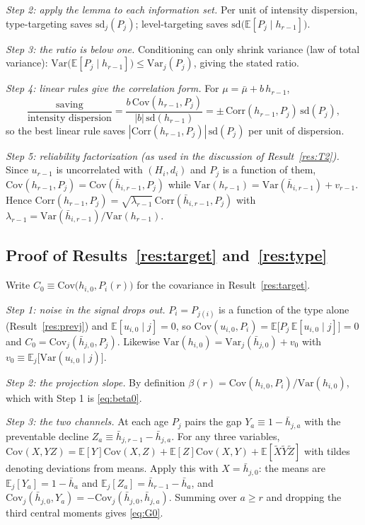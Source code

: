 \documentclass[11pt]{article}
\theoremstyle{remark}
\newcommand{\E}{\mathbb{E}}
\newcommand{\Var}{\mathrm{Var}}
\newcommand{\Cov}{\mathrm{Cov}}
\newcommand{\Corr}{\mathrm{Corr}}
\begin{document}
\emph{Step 2: apply the lemma to each information set.} Per unit of intensity dispersion, type-targeting saves $\mathrm{sd}_j(P_j)$; level-targeting saves $\mathrm{sd}\bigl(\E[P_j\mid h_{r-1}]\bigr)$.

\emph{Step 3: the ratio is below one.} Conditioning can only shrink variance (law of total variance): $\Var\bigl(\E[P_j\mid h_{r-1}]\bigr)\le\Var_j(P_j)$, giving the stated ratio.

\emph{Step 4: linear rules give the correlation form.} For $\mu=\bar\mu+b\,h_{r-1}$,
\begin{equation}
\frac{\text{saving}}{\text{intensity dispersion}}
=\frac{b\,\Cov(h_{r-1},P_j)}{|b|\,\mathrm{sd}(h_{r-1})}
=\pm\,\Corr(h_{r-1},P_j)\,\mathrm{sd}(P_j),
\end{equation}
so the best linear rule saves $|\Corr(h_{r-1},P_j)|\,\mathrm{sd}(P_j)$ per unit of dispersion.

\emph{Step 5: reliability factorization (as used in the discussion of Result~\ref{res:T2}).} Since $u_{r-1}$ is uncorrelated with $(H_i,d_i)$ and $P_j$ is a function of them, $\Cov(h_{r-1},P_j)=\Cov(\bar h_{i,r-1},P_j)$ while $\Var(h_{r-1})=\Var(\bar h_{i,r-1})+v_{r-1}$.
Hence $\Corr(h_{r-1},P_j)=\sqrt{\lambda_{r-1}}\,\Corr(\bar h_{i,r-1},P_j)$ with $\lambda_{r-1}=\Var(\bar h_{i,r-1})/\Var(h_{r-1})$.

\subsection*{Proof of Results~\ref{res:target} and~\ref{res:type}}

Write $C_0\equiv\Cov\bigl(h_{i,0},P_i(r)\bigr)$ for the covariance in Result~\ref{res:target}.

\emph{Step 1: noise in the signal drops out.} $P_i=P_{j(i)}$ is a function of the type alone (Result~\ref{res:prevj}) and $\E[u_{i,0}\mid j]=0$, so $\Cov(u_{i,0},P_i)=\E\bigl[P_j\,\E[u_{i,0}\mid j]\bigr]=0$ and $C_0=\Cov_j(\bar h_{j,0},P_j)$.
Likewise $\Var(h_{i,0})=\Var_j(\bar h_{j,0})+v_0$ with $v_0\equiv\E_j\bigl[\Var(u_{i,0}\mid j)\bigr]$.

\emph{Step 2: the projection slope.} By definition $\beta(r)=\Cov(h_{i,0},P_i)/\Var(h_{i,0})$, which with Step 1 is \eqref{eq:beta0}.

\emph{Step 3: the two channels.} At each age $P_j$ pairs the gap $Y_a\equiv1-\bar h_{j,a}$ with the preventable decline $Z_a\equiv\bar h_{j,r-1}-\bar h_{j,a}$.
For any three variables, $\Cov(X,YZ)=\E[Y]\Cov(X,Z)+\E[Z]\Cov(X,Y)+\E[\tilde X\tilde Y\tilde Z]$ with tildes denoting deviations from means.
Apply this with $X=\bar h_{j,0}$: the means are $\E_j[Y_a]=1-\bar h_a$ and $\E_j[Z_a]=\bar h_{r-1}-\bar h_a$, and $\Cov_j(\bar h_{j,0},Y_a)=-\Cov_j(\bar h_{j,0},\bar h_{j,a})$.
Summing over $a\ge r$ and dropping the third central moments gives \eqref{eq:G0}.
\end{document}
